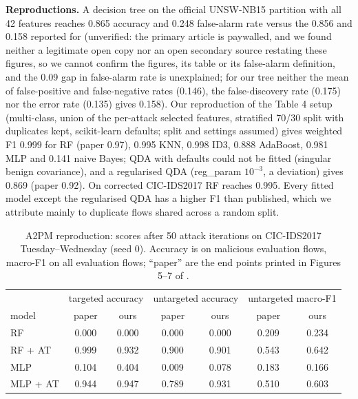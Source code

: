 \documentclass[11pt]{article}
\begin{document}
\textbf{Reproductions.} A decision tree on the official UNSW-NB15 partition with all 42 features
reaches 0.865 accuracy and 0.248 false-alarm rate versus the 0.856 and 0.158 reported for
\cite{moustafa2016} (unverified: the primary article is paywalled, and we found neither a legitimate open copy nor an
open secondary source restating these figures, so we cannot confirm the figures, its table or its false-alarm definition, and the 0.09 gap in false-alarm rate is
unexplained; for our tree neither the mean of false-positive and false-negative rates (0.146), the
false-discovery rate (0.175) nor the error rate (0.135) gives 0.158). Our reproduction of the
\cite{sharafaldin2018} Table 4 setup (multi-class, union of the per-attack selected features,
stratified 70/30 split with duplicates kept, scikit-learn defaults; split and settings assumed)
gives weighted F1 0.999 for RF (paper 0.97), 0.995 KNN, 0.998 ID3, 0.888 AdaBoost, 0.981 MLP and
0.141 naive Bayes; QDA with defaults could not be fitted (singular benign covariance), and a regularised QDA (reg\_param $10^{-3}$, a deviation) gives 0.869 (paper 0.92). On corrected CIC-IDS2017 \cite{engelen2021} RF reaches 0.995. Every fitted model except the
regularised QDA has a higher F1 than published, which we attribute mainly to duplicate flows shared
across a random split.

\begin{table}[h]\centering\small
\begin{tabular}{lcccccc}\toprule
& \multicolumn{2}{c}{targeted accuracy} & \multicolumn{2}{c}{untargeted accuracy} &
\multicolumn{2}{c}{untargeted macro-F1}\\
model & paper & ours & paper & ours & paper & ours\\\midrule
RF & 0.000 & 0.000 & 0.000 & 0.000 & 0.209 & 0.234\\
RF + AT & 0.999 & 0.932 & 0.900 & 0.901 & 0.543 & 0.642\\
MLP & 0.104 & 0.404 & 0.009 & 0.078 & 0.183 & 0.166\\
MLP + AT & 0.944 & 0.947 & 0.789 & 0.931 & 0.510 & 0.603\\\bottomrule
\end{tabular}
\caption{A2PM reproduction: scores after 50 attack iterations on CIC-IDS2017 Tuesday--Wednesday
(seed 0). Accuracy is on malicious evaluation flows, macro-F1 on all evaluation flows; ``paper'' are
the end points printed in Figures 5--7 of \cite{vitorino2022}.}
\end{table}
\end{document}
